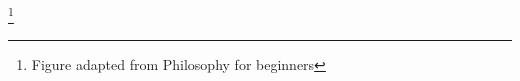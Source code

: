\documentclass[unicode, 14pt, aspectratio=169]{beamer}
\newcommand\blfootnote[1]{%
  \begingroup
  \renewcommand\thefootnote{}\footnote{#1}%
  \addtocounter{footnote}{-1}%
  \endgroup
}
\begin{document}
\begin{frame}
\begin{columns}
\begin{column}{0.2\textwidth}
\begin{figure}
      \end{figure}       
    \end{column} 
  \end{columns}
  \blfootnote{Figure adapted from Philosophy for beginners\supercite{philosophy-for-begginers}}
\end{frame}
\end{document}
